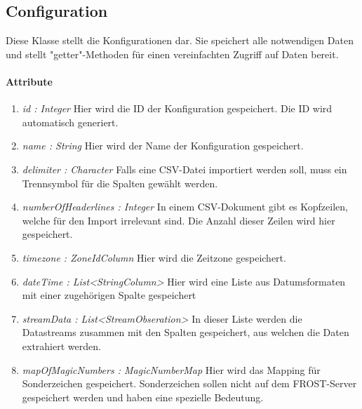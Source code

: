 \subsection{Configuration}
Diese Klasse stellt die Konfigurationen dar. 
Sie speichert alle notwendigen Daten und stellt "{getter}"{-Methoden} für einen vereinfachten Zugriff auf Daten bereit.

\paragraph{Attribute}

\begin{enumerate}[-]
	\item \textit{id : Integer} Hier wird die ID der Konfiguration gespeichert. Die ID wird automatisch generiert.
	
	\item \textit{name : String} Hier wird der Name der Konfiguration gespeichert.
	
	\item \textit{delimiter : Character} Falls eine CSV-Datei importiert werden soll, muss ein Trennsymbol für die Spalten gewählt werden.
	
	\item \textit{numberOfHeaderlines : Integer} In einem CSV-Dokument gibt es Kopfzeilen, welche für den Import irrelevant sind. Die Anzahl dieser Zeilen wird hier gespeichert.
	
	\item \textit{timezone : ZoneIdColumn} Hier wird die Zeitzone gespeichert.
	
	\item \textit{dateTime : List<StringColumn>} Hier wird eine Liste aus Datumsformaten mit einer zugehörigen Spalte gespeichert 
	
	\item \textit{streamData : List<StreamObseration>} In dieser Liste werden die Datastreams zusammen mit den Spalten gespeichert, aus welchen die Daten extrahiert werden.
	
	\item \textit{mapOfMagicNumbers : MagicNumberMap} Hier wird das Mapping für Sonderzeichen gespeichert. Sonderzeichen sollen nicht auf dem FROST-Server gespeichert werden und haben eine spezielle Bedeutung.
\end{enumerate}

